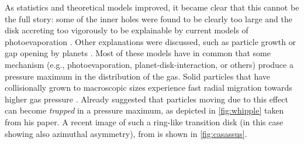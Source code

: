 \documentclass[10pt,fleqn,twoside]{article}
\begin{document}
As statistics and theoretical models improved, it became clear that
this cannot be the full story: some of the inner holes were found to
be clearly too large and the disk accreting too vigorously to be
explainable by current models of photoevaporation
\citep[i.e.\ Type 2 TDs,][]{2010MNRAS.401.1415O,2011MNRAS.412...13O}.
Other explanations were discussed, such as particle growth
\citep{2005A&A...434..971D,2005ApJ...625..414T,2012A&A...544A..79B} or
gap opening by planets
\citep{2004A&A...425L...9P,2006A&A...453.1129P,2006MNRAS.373.1619R,
2012A&A...545A..81P,2012ApJ...755....6Z}. Most of these models have in
common that some mechanism (e.g., photoevaporation,
planet-disk-interaction, or others) produce a pressure maximum in the
distribution of the gas.
Solid particles that have collisionally grown to macroscopic sizes
experience fast radial migration towards higher gas pressure
\citep{1972fpp..conf..211W,1977MNRAS.180...57W,1986Icar...67..375N}.
Already \citet{1972fpp..conf..211W} suggested that particles moving
due to this effect can become \textit{trapped} in a pressure maximum,
as depicted in \autoref{fig:whipple} taken from his paper. A recent
image of such a ring-like transition disk (in this case showing also
azimuthal asymmetry), from \cite{2013Natur.493..191C} is shown in
\autoref{fig:casassus}.
\end{document}
